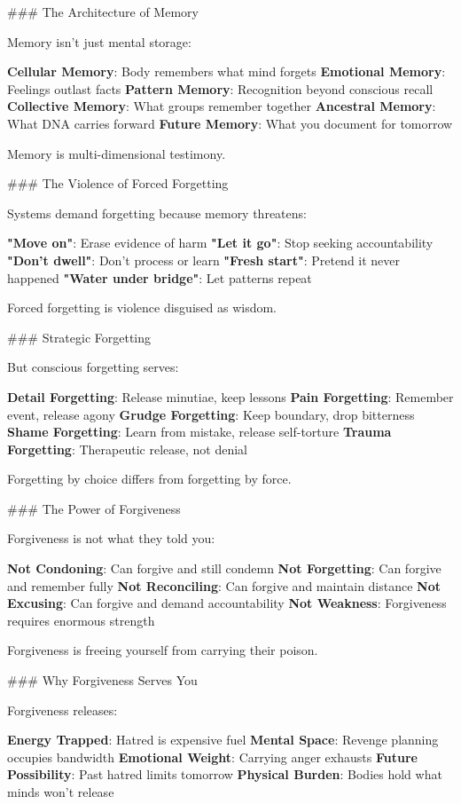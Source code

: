 \documentclass[12pt]{book}
\begin{document}
\#\#\# The Architecture of Memory

Memory isn't just mental storage:

\textbf{Cellular Memory}: Body remembers what mind forgets
\textbf{Emotional Memory}: Feelings outlast facts
\textbf{Pattern Memory}: Recognition beyond conscious recall
\textbf{Collective Memory}: What groups remember together
\textbf{Ancestral Memory}: What DNA carries forward
\textbf{Future Memory}: What you document for tomorrow

Memory is multi-dimensional testimony.

\#\#\# The Violence of Forced Forgetting

Systems demand forgetting because memory threatens:

\textbf{"Move on"}: Erase evidence of harm
\textbf{"Let it go"}: Stop seeking accountability
\textbf{"Don't dwell"}: Don't process or learn
\textbf{"Fresh start"}: Pretend it never happened
\textbf{"Water under bridge"}: Let patterns repeat

Forced forgetting is violence disguised as wisdom.

\#\#\# Strategic Forgetting

But conscious forgetting serves:

\textbf{Detail Forgetting}: Release minutiae, keep lessons
\textbf{Pain Forgetting}: Remember event, release agony
\textbf{Grudge Forgetting}: Keep boundary, drop bitterness
\textbf{Shame Forgetting}: Learn from mistake, release self-torture
\textbf{Trauma Forgetting}: Therapeutic release, not denial

Forgetting by choice differs from forgetting by force.

\#\#\# The Power of Forgiveness

Forgiveness is not what they told you:

\textbf{Not Condoning}: Can forgive and still condemn
\textbf{Not Forgetting}: Can forgive and remember fully
\textbf{Not Reconciling}: Can forgive and maintain distance
\textbf{Not Excusing}: Can forgive and demand accountability
\textbf{Not Weakness}: Forgiveness requires enormous strength

Forgiveness is freeing yourself from carrying their poison.

\#\#\# Why Forgiveness Serves You

Forgiveness releases:

\textbf{Energy Trapped}: Hatred is expensive fuel
\textbf{Mental Space}: Revenge planning occupies bandwidth
\textbf{Emotional Weight}: Carrying anger exhausts
\textbf{Future Possibility}: Past hatred limits tomorrow
\textbf{Physical Burden}: Bodies hold what minds won't release
\end{document}
